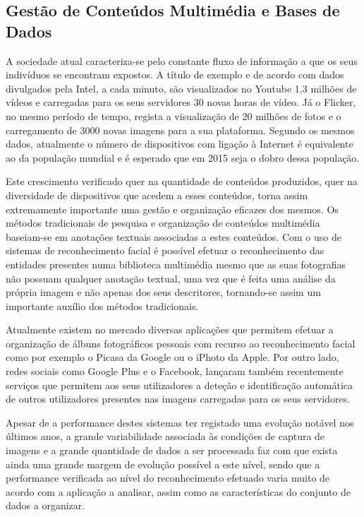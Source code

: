 \subsection{Gestão de Conteúdos Multimédia e Bases de Dados} \label{GestaoMultimedia}
A sociedade atual caracteriza-se pelo constante fluxo de informação a que os seus indivíduos se encontram expostos. A título de exemplo e de acordo com dados divulgados pela Intel\citep{IntelCorporation}, a cada minuto, são visualizados no Youtube 1,3 milhões de vídeos e carregadas para os seus servidores 30 novas horas de vídeo. Já o Flicker, no mesmo período de tempo, regista a visualização de 20 milhões de fotos e o carregamento de 3000 novas imagens para a sua plataforma. Segundo os mesmos dados, atualmente o número de dispositivos com ligação à Internet é equivalente ao da população mundial e é esperado que em 2015 seja o dobro dessa população.

Este crescimento verificado quer na quantidade de conteúdos produzidos, quer na diversidade de dispositivos que acedem a esses conteúdos, torna assim extremamente importante uma gestão e organização eficazes dos mesmos. Os métodos tradicionais de pesquisa e organização de conteúdos multimédia baseiam-se em anotações textuais associadas a estes conteúdos. Com o uso de sistemas de reconhecimento facial é possível efetuar o reconhecimento das entidades presentes numa biblioteca multimédia mesmo que as suas fotografias não possuam qualquer anotação textual, uma vez que é feita uma análise da própria imagem e não apenas dos seus descritores, tornando-se assim um importante auxílio dos métodos tradicionais.

Atualmente existem no mercado diversas aplicações que permitem efetuar a organização de álbuns fotográficos  pessoais com recurso ao reconhecimento facial como por exemplo o Picasa da Google ou o iPhoto da Apple. Por outro lado, redes sociais como Google Plus e o Facebook, lançaram também recentemente serviços que permitem aos seus utilizadores a deteção e identificação automática de outros utilizadores presentes nas imagens carregadas para os seus servidores.

Apesar de a performance destes sistemas ter registado uma evolução notável nos últimos anos, a grande variabilidade associada às condições de captura de imagens e a grande quantidade de dados a ser processada faz com que exista ainda uma grande margem de evolução possível a este nível, sendo que a performance verificada ao nível do reconhecimento efetuado varia muito de acordo com a aplicação a analisar, assim como as características do conjunto de dados a organizar.


